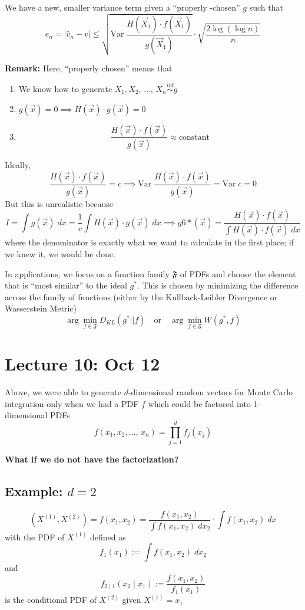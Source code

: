 \documentclass[12pt]{article}
\renewcommand{\hat}[1]{\widehat{#1}}
\newcommand{\Var}{\text{Var}\;}
\begin{document}
We have a new, smaller variance term given a ``properly -chosen'' $g$ such that 
\[e_n = \big\vert \hat v_n - v\big\vert \leq \sqrt{\Var \frac{H(\vec X_1) \cdot f(\vec X_1)}{g(\vec X_1)}} \cdot \sqrt{\frac{2 \log(\log n)}{n}}\]

\textbf{Remark:} Here, ``properly chosen'' means that
\begin{enumerate}
    \item We know how to generate $X_1, X_2, \, \dots,\, X_n \overset{iid}{\sim} g$
    \item $g(\vec x) = 0 \implies H(\vec x) \cdot g(\vec x) = 0$
    \item \[\frac{H(\vec x) \cdot f(\vec x)}{g(\vec x)} \approx \text{constant}\]
\end{enumerate}

Ideally, 
\[\frac{H(\vec x) \cdot f(\vec x)}{g(\vec x)} = c \implies \Var \frac{H(\vec x) \cdot f(\vec x)}{g(\vec x)} = \Var c = 0\]
But this is unrealistic because 
\[I = \int g(\vec x) \; dx = \frac{1}{c} \int H(\vec x) \cdot g(\vec x) \; dx \implies g6*(\vec x) = \frac{H(\vec x) \cdot f(\vec x)}{\int H(\vec x) \cdot f(\vec x)\; dx}\]
where the denominator is exactly what we want to calculate in the first place; if we knew it, we would be done.  

In applications, we focus on a function family $\mathfrak{F}$ of PDFs and choose the element that is ``most similar'' to the ideal $g^*$. This is chosen by minimizing the difference across the family of functions (either by the Kullback-Leibler Divergence or Wasserstein Metric)
\[\arg\min_{f\in \mathfrak{F}} D_{KL}(g^* \big\vert \big\vert f) \quad \text{or} \quad \arg\min_{f \in \mathfrak{F}}W(g^*, f)\]

\section*{Lecture 10: Oct 12}
Above, we were able to generate $d$-dimensional random vectors for Monte Carlo integration only when we had a PDF $f$ which could be factored into 1-dimensional PDFs 
\[f(x_1, x_2, \dots,\, x_n) = \prod_{j=1}^d f_j(x_j)\]

\textbf{What if we do not have the factorization?}

\subsection*{Example: $d = 2$}
\[(X^{(1)}, X^{(2)}) = f(x_1, x_2) = \frac{f(x_1, x_2)}{\int f(x_1, x_2)\; dx_2} \cdot \int f(x_1, x_2)\; dx\]
with the PDF of $X^{(1)}$ defined as 
\[f_1(x_1) := \int f(x_1, x_2)\; dx_2\]
and 
\[f_{2\; | \;1}(x_2 \; | \; x_1) := \frac{f(x_1, x_2)}{f_1(x_1)}\]
is the conditional PDF of $X^{(2)}$ given $X^{(1)} = x_1$
\end{document}
